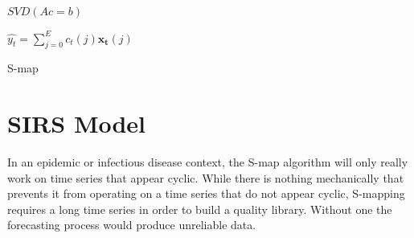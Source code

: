\documentclass[12pt]{article}
\begin{document}
    \begin{algorithm}[H]

        \BlankLine

        \DontPrintSemicolon


        \BlankLine


        \BlankLine


        \BlankLine

        $SVD(Ac = b)$

        \BlankLine

        $\hat{y_t} = \sum_{j = 0}^{E} c_t (j) \mathbf{x_t} (j)$

        \BlankLine


        \BlankLine

        \caption{S-map}\label{smap}

    \end{algorithm}

\section{SIRS Model}

	In an epidemic or infectious disease context, the S-map algorithm will only really work on time series that appear cyclic. While there is nothing mechanically that prevents it from operating on a time series that do not appear cyclic, S-mapping requires a long time series in order to build a quality library. Without one the forecasting process would produce unreliable data.
\end{document}
